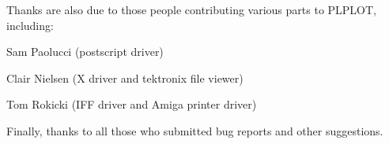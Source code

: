 Thanks are also due to those people contributing various parts to PLPLOT,
including:
\begin{description}
\item Sam Paolucci (postscript driver)
\item Clair Nielsen (X driver and tektronix file viewer)
\item Tom Rokicki (IFF driver and Amiga printer driver)
\end{description}

Finally, thanks to all those who submitted bug reports and other
suggestions.
